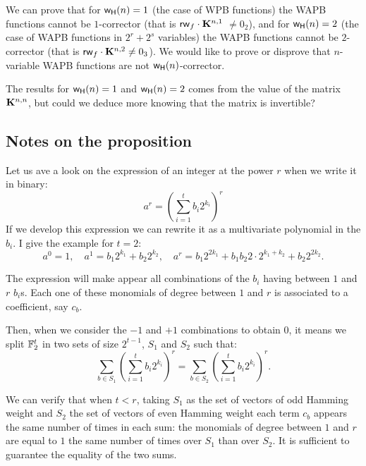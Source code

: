 \documentclass[11pt]{llncs}
\begin{document}
We can prove that for $\mathsf{w_H}(n)=1$ (the case of WPB functions) the WAPB functions cannot be $1$-corrector
(that is $\mathsf{rw}_{f} \cdot \mathbf{K}^{n,1}$
$\neq 0_2$), and for
 $\mathsf{w_H}(n)=2$
  (the case of WAPB functions in $2^r +2^s$ variables) the WAPB functions
 cannot be $2$-corrector (that is $\mathsf{rw}_{f} \cdot \mathbf{K}^{n,2} \ne 0_3$).
We would like to prove or disprove that $n$-variable WAPB functions are not $\mathsf{w_H}(n)$-corrector.

The results for $\mathsf{w_H}(n)=1$ and $\mathsf{w_H}(n)=2$ comes from the value of the matrix $\mathbf{K}^{n,n}$, but could we deduce more knowing that the matrix is invertible?






\subsection{Notes on the proposition}

Let us ave a look on the expression of an integer at the power $r$ when we write it in binary:
\[a^r=(\sum_{i=1}^{t} b_i 2^{k_i})^r\]
If we develop this expression we can rewrite it as a multivariate polynomial in the $b_i$.
I give the example for $t=2$:
\[a^0=1, \quad a^1= b_1 2^{k_1}+ b_2 2^{k_2},\quad a^r= b_1 2^{2k_1} + b_1 b_2 2\cdot  2^{k_1+k_2} + b_2 2^{2k_2}.\]

The expression will make appear all combinations of the $b_i$ having between $1$ and $r$ $b_i$s. Each one of these monomials of degree between $1$ and $r$ is associated to a coefficient, say $c_b$.

Then, when we consider the $-1$ and $+1$ combinations to obtain $0$, it means we split $\mathbb{F}_2^t$ in two sets of size $2^{t-1}$, $S_1$ and $S_2$ such that:
\[\sum_{b\in S_1} (\sum_{i=1}^{t} b_i 2^{k_i})^r =  \sum_{b\in S_2} (\sum_{i=1}^{t} b_i 2^{k_i})^r.\]

We can verify that when $t<r$, taking $S_1$ as the set of vectors of odd Hamming weight and $S_2$ the set of vectors of even Hamming weight each term $c_b$ appears the same number of times in each sum: the monomials of degree between $1$ and $r$ are equal to $1$ the same number of times over $S_1$ than over $S_2$. It is sufficient to guarantee the equality of the two sums.
\end{document}
